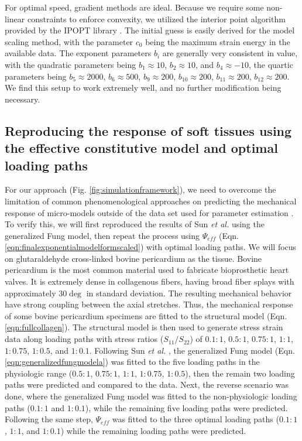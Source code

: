 	For optimal speed, gradient methods are ideal. Because we require some non-linear constraints to enforce convexity, we utilized the interior point algorithm provided by the IPOPT library \cite{waechter_implementation_2005}. The initial guess is easily derived for the model scaling method, with the parameter $c_0$ being the maximum strain energy in the available data. The exponent parameters $b_i$ are generally very consistent in value, with the quadratic parameters being $b_1 \approx 10$, $b_2 \approx 10$, and $b_4 \approx -10$, the quartic parameters being $b_5 \approx 2000$, $b_6 \approx 500$, $b_9 \approx 200$, $b_{10} \approx 200$, $b_{11} \approx 200$, $b_{12} \approx 200$. We find this setup to work extremely well, and no further modification being necessary. 




\subsection{Reproducing the response of soft tissues using the effective constitutive model and optimal loading paths}\label{sec:reproducefung}

	For our approach (Fig. \ref{fig:simulationframework}), we need to overcome the limitation of common phenomenological approaches on predicting the mechanical response of micro-models outside of the data set used for parameter estimation \cite{sun_biaxial_2003}. To verify this, we will first reproduced the results of Sun \textit{et al.} \cite{sun_biaxial_2003} using the generalized Fung model, then repeat the process using $\Psi_{eff}$ (Eqn. \ref{eqn:finalexponentialmodelformscaled}) with optimal loading paths. We will focus on glutaraldehyde cross-linked bovine pericardium as the tissue. Bovine pericardium is the most common material used to fabricate bioprosthetic heart valves. It is extremely dense in collagenous fibers, having broad fiber splays with approximately $30\deg$ in standard deviation. The resulting mechanical behavior have strong coupling between the axial stretches. Thus, the mechanical response of some bovine pericardium specimens are fitted to the structural model (Eqn. \ref{eqn:fullcollagen}). The structural model is then used to generate stress strain data along loading paths with stress ratios ($S_{11}/S_{22}$) of $0.1:1$, $0.5:1$, $0.75:1$, $1:1$, $1:0.75$, $1:0.5$, and $1:0.1$. Following Sun \textit{et al.} \cite{sun_biaxial_2003}, the generalized Fung model (Eqn. \ref{eqn:generalizedfungmodela}) was fitted to the five loading paths in the physiologic range ($0.5:1$, $0.75:1$, $1:1$, $1:0.75$, $1:0.5$), then the remain two loading paths were predicted and compared to the data. Next, the reverse scenario was done, where the generalized Fung model was fitted to the non-physiologic loading paths ($0.1:1$ and $1:0.1$), while the remaining five loading paths were predicted. Following the same step, $\Psi_{eff}$ was fitted to the three optimal loading paths ($0.1:1$, $1:1$, and $1:0.1$) while the remaining loading paths were predicted. 
    
